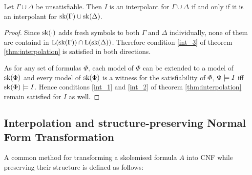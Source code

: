 \begin{prop}
	Let $\Gamma \cup \Delta$ be unsatisfiable.
	Then $I$ is an interpolant for $\Gamma \cup \Delta$ if and only if it is an interpolant for $\mathrm{sk}(\Gamma) \cup \mathrm{sk}(\Delta)$. 
\end{prop}

\begin{proof}
	Since $\mathrm{sk}(\cdot)$ adds fresh symbols to both $\Gamma$ and $\Delta$ individually,
	none of them are containd in $\mathrm{L}(\mathrm{sk}(\Gamma)) \cap \mathrm{L}(\mathrm{sk}(\Delta))$.
	Therefore condition \ref{int_3} of theorem \ref{thm:interpolation} is satisfied in both directions.

	As for any set of formulas $\Phi$, each model of $\Phi$ can be extended to a model of $\mathrm{sk}(\Phi)$ and every model of $\mathrm{sk}(\Phi)$ is a witness for the satisfiability of $\Phi$, $\Phi \models I$ iff $\mathrm{sk}(\Phi) \models I$.
	Hence conditions \ref{int_1} and \ref{int_2} of theorem \ref{thm:interpolation} remain satisfied for $I$ as well.
\end{proof}


\subsection{Interpolation and structure-preserving Normal Form Transformation}

A common method for transforming a skolemised formula $A$ into CNF while preserving their structure is defined as follows:

